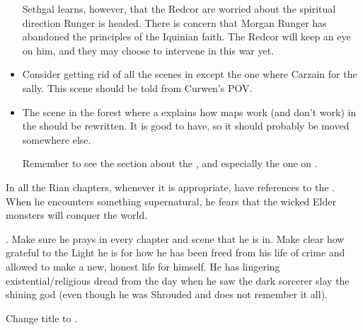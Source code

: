 \begin{changes}
\begin{itemize}
        Sethgal learns, however, that the Redcor are worried about the spiritual direction Runger is headed. 
        There is concern that Morgan Runger has abandoned the principles of the Iquinian faith. 
        The Redcor will keep an eye on him, and they may choose to intervene in this war yet. 
        
      \item 
        Consider getting rid of all the scenes in \Forclin{} except the one where Carzain  for the sally. 
        This scene should be told from Curwen's POV. 
        
      \item 
        The scene in the forest where a \ranger{} explains how maps work (and don't work) in the \wylde{} should be rewritten. 
        It is good to have, so it should probably be moved somewhere else. 

        Remember to see the section about the , and especially the one on . 
    \end{itemize}
  
  \begin{comment}\paragraph{Captured}\end{comment}
    
    In all the Rian chapters, whenever it is appropriate, have references to the . 
    When he encounters something supernatural, he fears that the wicked Elder monsters will conquer the world. 
    
    .
    Make sure he prays in every chapter and scene that he is in.
    Make clear how grateful to the Light he is for how he has been freed from his life of crime and allowed to make a new, honest life for himself.
    He has lingering existential/religious dread from the day when he saw the dark sorcerer slay the shining god (even though he was Shrouded and does not remember it all). 
  
  \begin{comment}\paragraph{Trinity of Plagues}\end{comment}
    Change title to . 
    

\end{changes}
